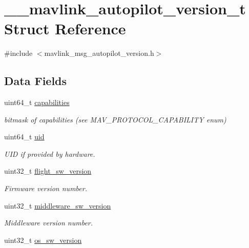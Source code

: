 \hypertarget{struct____mavlink__autopilot__version__t}{\section{\+\_\+\+\_\+mavlink\+\_\+autopilot\+\_\+version\+\_\+t Struct Reference}
\label{struct____mavlink__autopilot__version__t}
}


{\ttfamily \#include $<$mavlink\+\_\+msg\+\_\+autopilot\+\_\+version.\+h$>$}

\subsection*{Data Fields}
\begin{DoxyCompactItemize}
\item 
uint64\+\_\+t \hyperlink{struct____mavlink__autopilot__version__t_abdb6dbb248808dbed7e556c33de391f0}{capabilities}
\begin{DoxyCompactList}\small\item\em bitmask of capabilities (see M\+A\+V\+\_\+\+P\+R\+O\+T\+O\+C\+O\+L\+\_\+\+C\+A\+P\+A\+B\+I\+L\+I\+T\+Y enum) \end{DoxyCompactList}\item 
uint64\+\_\+t \hyperlink{struct____mavlink__autopilot__version__t_af748a25ba9a0f3126cf5f5e65d17ebce}{uid}
\begin{DoxyCompactList}\small\item\em U\+I\+D if provided by hardware. \end{DoxyCompactList}\item 
uint32\+\_\+t \hyperlink{struct____mavlink__autopilot__version__t_a18da1ad779dd4f54f87231ea355e79f4}{flight\+\_\+sw\+\_\+version}
\begin{DoxyCompactList}\small\item\em Firmware version number. \end{DoxyCompactList}\item 
uint32\+\_\+t \hyperlink{struct____mavlink__autopilot__version__t_af3db01348e485516330cd2096348767b}{middleware\+\_\+sw\+\_\+version}
\begin{DoxyCompactList}\small\item\em Middleware version number. \end{DoxyCompactList}\item 
uint32\+\_\+t \hyperlink{struct____mavlink__autopilot__version__t_a686bf3eff327a4e617e512bc141d7206}{os\+\_\+sw\+\_\+version}

\end{DoxyCompactItemize}
